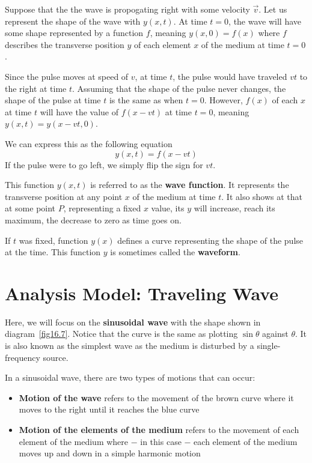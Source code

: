 \begin{figure}[h]
\begin{subfigure}{0.49\textwidth}
\end{subfigure}
\end{figure}

Suppose that the the wave is propogating right with some velocity $\vec{v}$.
Let us represent the shape of the wave with $y(x, t)$. At time $t = 0$, the wave will
have some shape represented by a function $f$, meaning $y(x, 0) = f(x)$ where 
$f$ describes the transverse position $y$ of each element $x$ of the medium at time $t=0$.

Since the pulse moves at speed of $v$, at time $t$, the pulse would have traveled $vt$
to the right at time $t$. Assuming that the shape of the pulse never changes, the shape
of the pulse at time $t$ is the same as when $t=0$. However, $f(x)$ of each $x$ at time
$t$ will have the value of $f(x-vt)$ at time $t=0$, meaning $y(x, t) = y(x-vt, 0)$.

We can express this as the following equation
\begin{equation}\label{16.1}
    y(x, t) = f(x - vt)
\end{equation}
If the pulse were to go left, we simply flip the sign for $vt$.

This function $y(x, t)$ is referred to as the \textbf{wave function}. It represents the 
transverse position at any point $x$ of the medium at time $t$. It also shows at that
at some point $P$, representing a fixed $x$ value, its $y$ will increase, reach its
maximum, the decrease to zero as time goes on.

If $t$ was fixed, function $y(x)$ defines a curve representing the shape of the pulse at
the time. This function $y$ is sometimes called the \textbf{waveform}.

\section{Analysis Model: Traveling Wave}

\label{fig16.7}
Here, we will focus on the \textbf{sinusoidal wave} with the shape shown in diagram~\ref{fig16.7}.
Notice that the curve is the same as plotting $\sin\theta$ against $\theta$. It is also known as 
the simplest wave as the medium is disturbed by a single-frequency source.

In a sinusoidal wave, there are two types of motions that can occur:
\begin{itemize}
    \item \textbf{Motion of the wave} refers to the movement of the brown curve where it moves to
        the right until it reaches the blue curve
    \item \textbf{Motion of the elements of the medium} refers to the movement of each element 
        of the medium where $-$ in this case $-$ each element of the medium moves up and down
        in a simple harmonic motion
\end{itemize}

